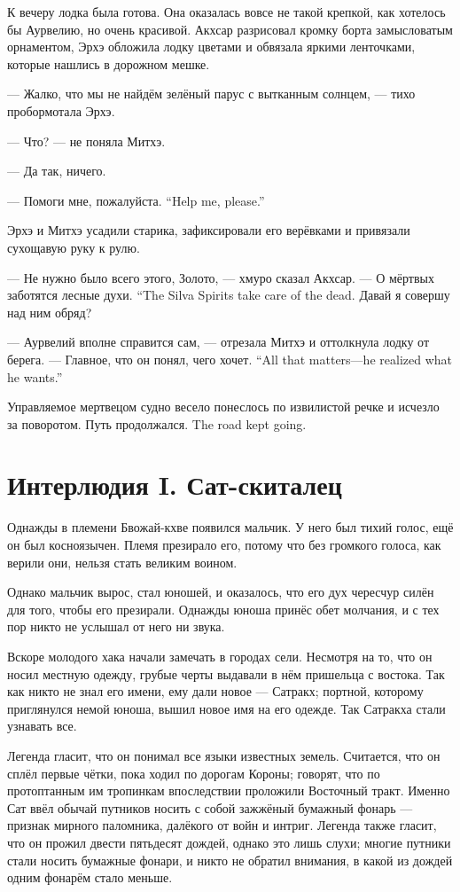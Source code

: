 К вечеру лодка была готова.
Она оказалась вовсе не такой крепкой, как хотелось бы Аурвелию, но очень красивой.
Акхсар разрисовал кромку борта замысловатым орнаментом, Эрхэ обложила лодку цветами и обвязала яркими ленточками, которые нашлись в дорожном мешке.

--- Жалко, что мы не найдём зелёный парус с вытканным солнцем, --- тихо пробормотала Эрхэ.

--- Что? --- не поняла Митхэ.

--- Да так, ничего.

{--- Помоги мне, пожалуйста.}
{``Help me, please.''}

Эрхэ и Митхэ усадили старика, зафиксировали его верёвками и привязали сухощавую руку к рулю.

--- Не нужно было всего этого, Золото, --- хмуро сказал Акхсар.
{--- О мёртвых заботятся лесные духи.}
{``The Silva Spirits take care of the dead.}
Давай я совершу над ним обряд?

--- Аурвелий вполне справится сам, --- отрезала Митхэ и оттолкнула лодку от берега.
{--- Главное, что он понял, чего хочет.}
{``All that matters---he realized what he wants.''}

Управляемое мертвецом судно весело понеслось по извилистой речке и исчезло за поворотом.
{Путь продолжался.}
{The road kept going.}

\chapter*{Интерлюдия I. Сат-скиталец}


Однажды в племени Бвожай-кхве появился мальчик.
У него был тихий голос, ещё он был косноязычен.
Племя презирало его, потому что без громкого голоса, как верили они, нельзя стать великим воином.

Однако мальчик вырос, стал юношей, и оказалось, что его дух чересчур силён для того, чтобы его презирали.
Однажды юноша принёс обет молчания, и с тех пор никто не услышал от него ни звука.

Вскоре молодого хака начали замечать в городах сели.
Несмотря на то, что он носил местную одежду, грубые черты выдавали в нём пришельца с востока.
Так как никто не знал его имени, ему дали новое --- Сатракх;
портной, которому приглянулся немой юноша, вышил новое имя на его одежде.
Так Сатракха стали узнавать все.

Легенда гласит, что он понимал все языки известных земель.
Считается, что он сплёл первые чётки, пока ходил по дорогам Короны;
говорят, что по протоптанным им тропинкам впоследствии проложили Восточный тракт.
Именно Сат ввёл обычай путников носить с собой зажжёный бумажный фонарь --- признак мирного паломника, далёкого от войн и интриг.
Легенда также гласит, что он прожил двести пятьдесят дождей, однако это лишь слухи;
многие путники стали носить бумажные фонари, и никто не обратил внимания, в какой из дождей одним фонарём стало меньше.

